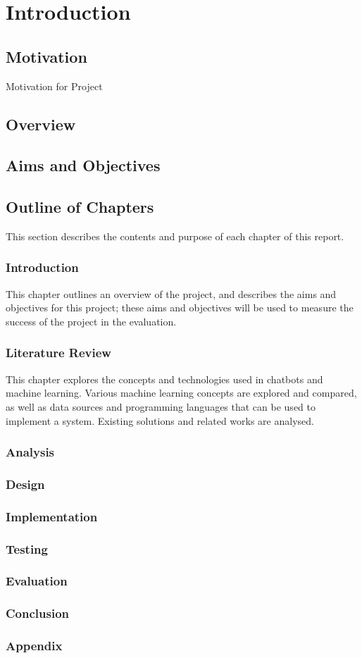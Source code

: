 \chapter{Introduction}
\section{Motivation}
Motivation for Project

\section{Overview}

\section{Aims and Objectives}


\section{Outline of Chapters}
This section describes the contents and purpose of each chapter of this report.

\subsection*{Introduction}
This chapter outlines an overview of the project, and describes the aims and objectives for this project; these aims and objectives will be used to measure the success of the project in the evaluation.

\subsection*{Literature Review}
This chapter explores the concepts and technologies used in chatbots and machine learning. Various machine learning concepts are explored and compared, as well as data sources and programming languages that can be used to implement a system. Existing solutions and related works are analysed.

\subsection*{Analysis}

\subsection*{Design}

\subsection*{Implementation}

\subsection*{Testing}

\subsection*{Evaluation}

\subsection*{Conclusion}

\subsection*{Appendix}

